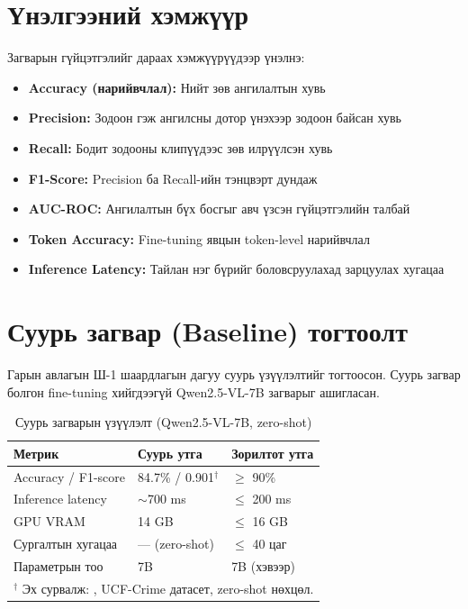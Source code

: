 \section{Үнэлгээний хэмжүүр}

Загварын гүйцэтгэлийг дараах хэмжүүрүүдээр үнэлнэ:

\begin{itemize}
    \item \textbf{Accuracy (нарийвчлал):} Нийт зөв ангилалтын хувь
    \item \textbf{Precision:} Зодоон гэж ангилсны дотор үнэхээр зодоон байсан хувь
    \item \textbf{Recall:} Бодит зодооны клипүүдээс зөв илрүүлсэн хувь
    \item \textbf{F1-Score:} Precision ба Recall-ийн тэнцвэрт дундаж
    \item \textbf{AUC-ROC:} Ангилалтын бүх босгыг авч үзсэн гүйцэтгэлийн талбай
    \item \textbf{Token Accuracy:} Fine-tuning явцын token-level нарийвчлал
    \item \textbf{Inference Latency:} Тайлан нэг бүрийг боловсруулахад зарцуулах хугацаа
\end{itemize}

\section{Суурь загвар (Baseline) тогтоолт}

Гарын авлагын Ш-1 шаардлагын дагуу суурь үзүүлэлтийг тогтоосон. Суурь загвар болгон fine-tuning хийгдээгүй Qwen2.5-VL-7B загварыг ашигласан.

\begin{table}[h]
\centering
\caption{Суурь загварын үзүүлэлт (Qwen2.5-VL-7B, zero-shot)}
\label{tab:baseline}
\begin{tabular}{lll}
\hline
\textbf{Метрик} & \textbf{Суурь утга} & \textbf{Зорилтот утга} \\
\hline
Accuracy / F1-score   & 84.7\% / 0.901$^\dagger$ & $\geq$ 90\% \\
Inference latency     & $\sim$700 ms              & $\leq$ 200 ms \\
GPU VRAM              & 14 GB                     & $\leq$ 16 GB \\
Сургалтын хугацаа     & --- (zero-shot)           & $\leq$ 40 цаг \\
Параметрын тоо        & 7B                        & 7B (хэвээр) \\
\hline
\multicolumn{3}{l}{\footnotesize $^\dagger$ Эх сурвалж: \cite{Borodin2025}, UCF-Crime датасет, zero-shot нөхцөл.}
\end{tabular}
\end{table}

